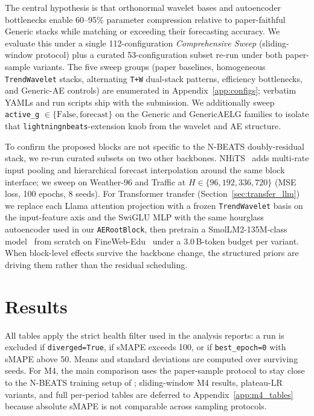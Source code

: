 \documentclass{article}
\begin{document}
The central hypothesis is that orthonormal wavelet bases and autoencoder bottlenecks enable 60--95\% parameter compression relative to paper-faithful Generic stacks while matching or exceeding their forecasting accuracy. We evaluate this under a single 112-configuration \emph{Comprehensive Sweep} (sliding-window protocol) plus a curated 53-configuration subset re-run under both paper-sample variants. The five sweep groups (paper baselines, homogeneous \texttt{TrendWavelet} stacks, alternating \texttt{T+W} dual-stack patterns, efficiency bottlenecks, and Generic-AE controls) are enumerated in Appendix~\ref{app:configs}; verbatim YAMLs and run scripts ship with the submission. We additionally sweep \texttt{active\_g} $\in \{\text{False}, \text{forecast}\}$ on the Generic and GenericAELG families to isolate that \texttt{lightningnbeats}-extension knob from the wavelet and AE structure.

To confirm the proposed blocks are not specific to the N-BEATS doubly-residual stack, we re-run curated subsets on two other backbones. NHiTS~\citep{challu2023nhits} adds multi-rate input pooling and hierarchical forecast interpolation around the same block interface; we sweep on Weather-96 and Traffic at $H \in \{96, 192, 336, 720\}$ (MSE loss, 100 epochs, 8 seeds). For Transformer transfer (Section~\ref{sec:transfer_llm}) we replace each Llama attention projection with a frozen \texttt{TrendWavelet} basis on the input-feature axis and the SwiGLU MLP with the same hourglass autoencoder used in our \texttt{AERootBlock}, then pretrain a SmolLM2-135M-class model~\citep{allal2025smollm2} from scratch on FineWeb-Edu~\citep{penedo2024fineweb} under a 3.0\,B-token budget per variant. When block-level effects survive the backbone change, the structured priors are driving them rather than the residual scheduling.


\section{Results}
\label{sec:results}

All tables apply the strict health filter used in the analysis reports: a run is excluded if \texttt{diverged=True}, if sMAPE exceeds 100, or if \texttt{best\_epoch=0} with sMAPE above 50. Means and standard deviations are computed over surviving seeds. For M4, the main comparison uses the paper-sample protocol to stay close to the N-BEATS training setup of \citet{oreshkin2020nbeats}; sliding-window M4 results, plateau-LR variants, and full per-period tables are deferred to Appendix~\ref{app:m4_tables} because absolute sMAPE is not comparable across sampling protocols.
\end{document}

